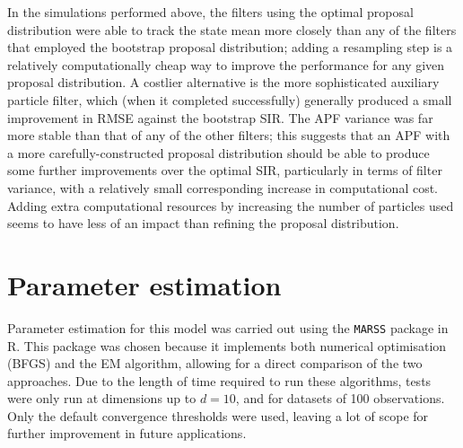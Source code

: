 \documentclass[10pt,fleqn]{article}
\begin{document}
In the simulations performed above, the filters using the optimal proposal distribution were able to track the state mean more closely than any of the filters that employed the bootstrap proposal distribution; adding a resampling step is a relatively computationally cheap way to improve the performance for any given proposal distribution. A costlier alternative is the more sophisticated auxiliary particle filter, which (when it completed successfully) generally produced a small improvement in RMSE against the bootstrap SIR. The APF variance was far more stable than that of any of the other filters; this suggests that an APF with a more carefully-constructed proposal distribution should be able to produce some further improvements over the optimal SIR, particularly in terms of filter variance, with a relatively small corresponding increase in computational cost. Adding extra computational resources by increasing the number of particles used seems to have less of an impact than refining the proposal distribution. 

\newpage
\section{Parameter estimation}

Parameter estimation for this model was carried out using the \texttt{MARSS} package in R. This package was chosen because it implements both numerical optimisation (BFGS) and the EM algorithm, allowing for a direct comparison of the two approaches. Due to the length of time required to run these algorithms, tests were only run at dimensions up to $d=10$, and for datasets of 100 observations. Only the default convergence thresholds were used, leaving a lot of scope for further improvement in future applications.
\end{document}
